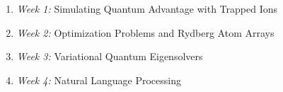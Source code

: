 \documentclass[12pt]{article}
\begin{document}
\begin{enumerate}
\item {\it Week 1:} Simulating Quantum Advantage with Trapped Ions
\item {\it Week 2:} Optimization Problems and Rydberg Atom Arrays
\item {\it Week 3:} Variational Quantum Eigensolvers
\item {\it Week 4:} Natural Language Processing

\end{enumerate}


\newpage



\end{document}
